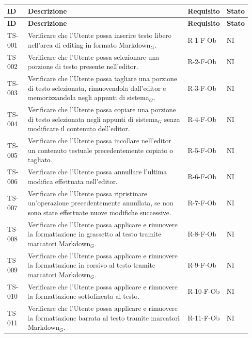 \documentclass[a4paper, 10pt, colorlinks=true, linkcolor=black, urlcolor=blue, citecolor=blue, hidelinks]{article}
\begin{document}
\begingroup
\small
\renewcommand{\arraystretch}{1.25}
\begin{longtable}{|p{1.4cm}|p{7.8cm}|p{2.3cm}|p{1.2cm}|}
    \hline
    \textbf{ID} & \textbf{Descrizione} & \textbf{Requisito} & \textbf{Stato} \\
    \hline
    \endfirsthead

    \hline
    \textbf{ID} & \textbf{Descrizione} & \textbf{Requisito} & \textbf{Stato} \\
    \hline
    \endhead

    TS-001 & Verificare che l'Utente possa inserire testo libero nell'area di editing in formato Markdown$_G$. & R-1-F-Ob & NI \\
    \hline
    TS-002 & Verificare che l'Utente possa selezionare una porzione di testo presente nell'editor. & R-2-F-Ob & NI \\
    \hline
    TS-003 & Verificare che l'Utente possa tagliare una porzione di testo selezionata, rimuovendola dall'editor e memorizzandola negli appunti di sistema$_G$. & R-3-F-Ob & NI \\
    \hline
    TS-004 & Verificare che l'Utente possa copiare una porzione di testo selezionata negli appunti di sistema$_G$ senza modificare il contenuto dell'editor. & R-4-F-Ob & NI \\
    \hline
    TS-005 & Verificare che l'Utente possa incollare nell'editor un contenuto testuale precedentemente copiato o tagliato. & R-5-F-Ob & NI \\
    \hline
    TS-006 & Verificare che l'Utente possa annullare l'ultima modifica effettuata nell'editor. & R-6-F-Ob & NI \\
    \hline
    TS-007 & Verificare che l'Utente possa ripristinare un'operazione precedentemente annullata, se non sono state effettuate nuove modifiche successive. & R-7-F-Ob & NI \\
    \hline
    TS-008 & Verificare che l'Utente possa applicare e rimuovere la formattazione in grassetto al testo tramite marcatori Markdown$_G$. & R-8-F-Ob & NI \\
    \hline
    TS-009 & Verificare che l'Utente possa applicare e rimuovere la formattazione in corsivo al testo tramite marcatori Markdown$_G$. & R-9-F-Ob & NI \\
    \hline
    TS-010 & Verificare che l'Utente possa applicare e rimuovere la formattazione sottolineata al testo. & R-10-F-Ob & NI \\
    \hline
    TS-011 & Verificare che l'Utente possa applicare e rimuovere la formattazione barrata al testo tramite marcatori Markdown$_G$. & R-11-F-Ob & NI \\

\end{longtable}
\end{document}
